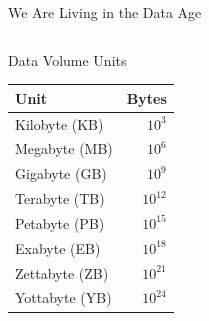 \documentclass[aspectratio=169,10pt]{beamer}
\begin{document}
\begin{frame}{We Are Living in the Data Age}
\begin{columns}[T]
      \begin{block}{Data Volume Units}
        \centering
        \small
        \renewcommand{\arraystretch}{1.2}
        \begin{tabular}{lr}
          \toprule
          \textbf{Unit} & \textbf{Bytes} \\
          \midrule
          Kilobyte (KB)  & $10^{3}$ \\
          Megabyte (MB)  & $10^{6}$ \\
          Gigabyte (GB)  & $10^{9}$ \\
          Terabyte (TB)  & $10^{12}$ \\
          Petabyte (PB)  & $10^{15}$ \\
          Exabyte (EB)   & $10^{18}$ \\
          \alert{Zettabyte (ZB)} & \alert{$10^{21}$} \\
          Yottabyte (YB) & $10^{24}$ \\
          \bottomrule
        \end{tabular}
      \end{block}
  \end{columns}
\end{frame}
\end{document}

